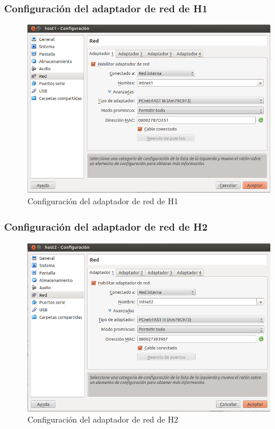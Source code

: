 \documentclass[a4paper,10pt]{article}
\begin{document}
			\subsubsection{Configuración del adaptador de red de H1}	
	\begin{figure}[!htb]
		\centering
		\includegraphics[width=11cm]{Imagenes/Host1ConfigAdaptador.png}
		\caption{Configuración del adaptador de red de H1} \label{img006}
	\end{figure}

			\subsubsection{Configuración del adaptador de red de H2}	
	\begin{figure}[!htb]
		\centering
		\includegraphics[width=11cm]{Imagenes/Host2ConfigAdaptador1.png}
		\caption{Configuración del adaptador de red de H2} \label{img007}
	\end{figure}
\end{document}

